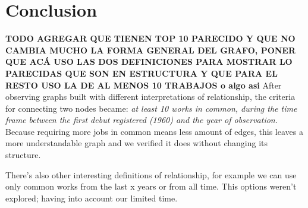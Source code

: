 \section{Conclusion}
\textbf{TODO AGREGAR QUE TIENEN TOP 10 PARECIDO Y QUE NO CAMBIA MUCHO LA FORMA GENERAL DEL GRAFO, PONER QUE ACÁ USO LAS DOS DEFINICIONES PARA MOSTRAR LO PARECIDAS QUE SON EN ESTRUCTURA Y QUE PARA EL RESTO USO LA DE AL MENOS 10 TRABAJOS o algo asi}
After observing graphs built with different interpretations of relationship, the criteria for connecting two nodes became: \textit{at least 10 works in common, during the time frame between the first debut registered (1960) and the year of observation}.
Because requiring more jobs in common means less amount of edges, this leaves a more understandable graph and we verified it does without changing its structure.

There's also other interesting definitions of relationship, for example we can use only common works from the last x years or from all time. This options weren't explored; having into account our limited time.

